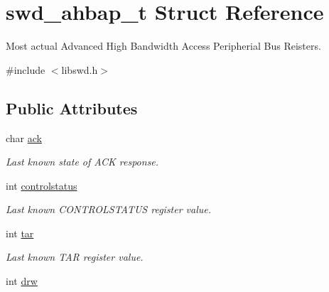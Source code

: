 \hypertarget{structswd__ahbap__t}{
\section{swd\_\-ahbap\_\-t Struct Reference}
\label{structswd__ahbap__t}
}


Most actual Advanced High Bandwidth Access Peripherial Bus Reisters.  




{\ttfamily \#include $<$libswd.h$>$}

\subsection*{Public Attributes}
\begin{DoxyCompactItemize}
\item 
\hypertarget{structswd__ahbap__t_ae97d8053bdd7942ad7d9f0190ba2b553}{
char \hyperlink{structswd__ahbap__t_ae97d8053bdd7942ad7d9f0190ba2b553}{ack}}
\label{structswd__ahbap__t_ae97d8053bdd7942ad7d9f0190ba2b553}

\begin{DoxyCompactList}\small\item\em Last known state of ACK response. \item\end{DoxyCompactList}\item 
\hypertarget{structswd__ahbap__t_ad399a57e76fa9c7a61c17ab498954f8c}{
int \hyperlink{structswd__ahbap__t_ad399a57e76fa9c7a61c17ab498954f8c}{controlstatus}}
\label{structswd__ahbap__t_ad399a57e76fa9c7a61c17ab498954f8c}

\begin{DoxyCompactList}\small\item\em Last known CONTROLSTATUS register value. \item\end{DoxyCompactList}\item 
\hypertarget{structswd__ahbap__t_a15b6ffdd7329ff0b7b275ecc1367d8be}{
int \hyperlink{structswd__ahbap__t_a15b6ffdd7329ff0b7b275ecc1367d8be}{tar}}
\label{structswd__ahbap__t_a15b6ffdd7329ff0b7b275ecc1367d8be}

\begin{DoxyCompactList}\small\item\em Last known TAR register value. \item\end{DoxyCompactList}\item 
\hypertarget{structswd__ahbap__t_a5c92da82c3524b8a129d3f6c500e8d74}{
int \hyperlink{structswd__ahbap__t_a5c92da82c3524b8a129d3f6c500e8d74}{drw}}
\label{structswd__ahbap__t_a5c92da82c3524b8a129d3f6c500e8d74}


\end{DoxyCompactItemize}
